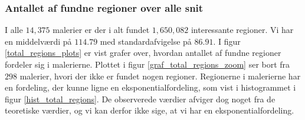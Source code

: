 {\subsubsection{Antallet af fundne regioner over alle snit}
I alle $14,375$ malerier er der i alt fundet $1,650,082$ interessante
regioner. Vi har en middelværdi på $114.79$ med standardafvigelse på
$86.91$. I figur \ref{total_regions_plots} er vist grafer over, hvordan
antallet af fundne regioner fordeler sig i malerierne. Plottet i figur
\ref{graf_total_regions_zoom} ser bort fra $298$ malerier, hvori der
ikke er fundet nogen regioner. Regionerne i malerierne har en fordeling,
der kunne ligne en eksponentialfordeling, som vist i histogrammet i
figur \ref{hist_total_regions}. De observerede værdier afviger dog noget
fra de teoretiske værdier, og vi kan derfor ikke sige, at vi har en
eksponentialfordeling.

}
